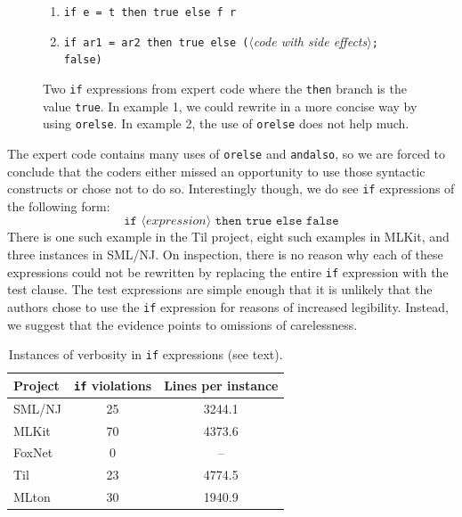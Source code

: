 \documentclass[12pt,abstracton]{scrartcl}
\begin{document}
\begin{figure}[h!]
\begin{enumerate}
\item \texttt{if e = t then true else f r}
\item \texttt{if ar1 = ar2 then true else (}$\langle$\emph{code with side effects}$\rangle$\texttt{; false)}
\end{enumerate}
\caption{Two \texttt{if} expressions from expert code where the \texttt{then} branch is the value \texttt{true}. In example 1, we could
rewrite in a more concise way by using \texttt{orelse}. In example 2, the use of \texttt{orelse} does not help much.}
\label{figure:ifthentrue}
\end{figure}

The expert code contains many uses of \texttt{orelse} and \texttt{andalso}, so we are forced to
conclude that the coders either missed an opportunity to use those syntactic constructs or chose
not to do so. Interestingly though, we do see \texttt{if} expressions of the following form:
\[\texttt{if }\langle expression\rangle\texttt{ then true else false}\]
There is one such example in the Til project, eight such examples in MLKit, and three instances
in SML/NJ. On inspection, there is no reason why each of these expressions could not be
rewritten by replacing the entire \texttt{if} expression with the test clause.
The test expressions are simple enough that it is unlikely that the authors
chose to use the \texttt{if} expression for reasons of increased legibility.
Instead, we suggest that the evidence points to omissions of carelessness.

\begin{table}[h!]
\centering
\begin{tabular}{|l||c|c|}\hline
Project & \texttt{if} violations & Lines per instance \\ \hline\hline
SML/NJ & 25 & 3244.1 \\
MLKit & 70 & 4373.6 \\
FoxNet & 0 & -- \\
Til & 23 & 4774.5 \\
MLton & 30 & 1940.9 \\ \hline
\end{tabular}
\caption{Instances of verbosity in \texttt{if} expressions (see text).}
\label{table:style}
\end{table}
\end{document}
